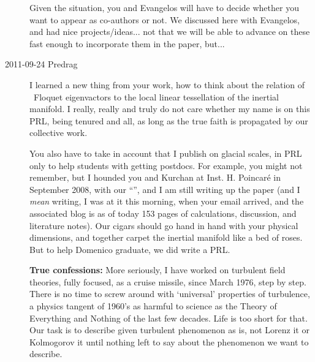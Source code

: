 \begin{description}
Given the situation, you  and Evangelos  will have to decide
whether you want to appear as co-authors or not. We discussed
here with Evangelos, and had nice projects/ideas... not that we will be
able to advance on these fast enough to incorporate them in the paper,
but...

\item[2011-09-24 Predrag]
I learned a new thing from your work, how to think about the relation of
\po\ Floquet eigenvactors to the local linear tessellation of the
inertial manifold.
I really, really and truly do not care whether my name is on this PRL,
being tenured and all, as long as the true faith is propagated by our
collective work.

You also have to take in account that
I publish on glacial scales, in PRL only to help students
with getting postdocs. For example, you might not remember, but I hounded
you and Kurchan  at Inst. H. Poincar\'e in September 2008, with our
``{\optPart}'', and I am still writing up
 {the
paper} (and I \emph{mean} writing, I was at it this morning,
when your email arrived, and the associated blog is as of today 153 pages
of calculations, discussion, and literature notes). Our cigars should go
hand in hand with your physical dimensions, and together carpet the
inertial manifold like a bed of roses. But to help Domenico graduate, we
did write a PRL.

\textbf{True confessions:} More seriously, I have worked on turbulent
field theories, fully focused, as a cruise missile, since
{March 1976}, step by step. There is no time to screw around with
`universal' properties of turbulence, a physics tangent of 1960's as
harmful to science as the Theory of Everything and Nothing of the last few
decades. Life is too short for that. Our task is to describe given
turbulent phenomenon as is, not Lorenz it or Kolmogorov it until nothing
left to say about the phenomenon we want to describe.


\end{description}
